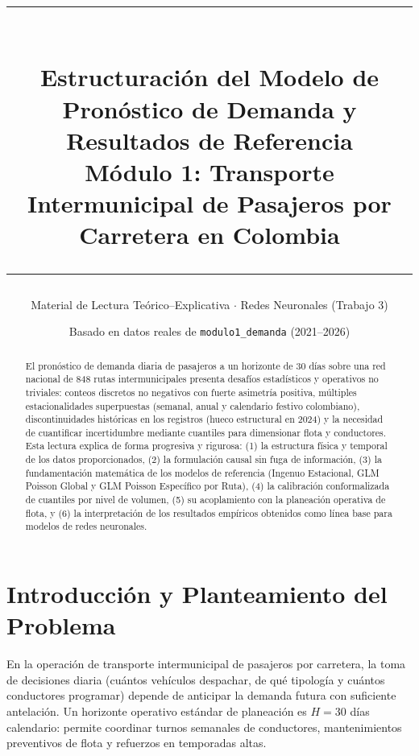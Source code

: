 \documentclass[11pt,a4paper]{article}
\title{
    \vspace{-1cm}
    {\color{azulInst}\rule{\linewidth}{1.5pt}}\\[0.4cm]
    {\Huge\bfseries\color{azulInst} Estructuración del Modelo de Pronóstico de Demanda y Resultados de Referencia}\\[0.25cm]
    {\Large\color{azulSec} Módulo 1: Transporte Intermunicipal de Pasajeros por Carretera en Colombia}\\[0.2cm]
    {\color{azulInst}\rule{\linewidth}{0.8pt}}
}
\author{Material de Lectura Teórico--Explicativa $\cdot$ Redes Neuronales (Trabajo 3)}
\date{Basado en datos reales de \texttt{modulo1\_demanda} (2021--2026)}
\begin{document}
\maketitle
\thispagestyle{empty}

\begin{abstract}
\noindent El pronóstico de demanda diaria de pasajeros a un horizonte de 30 días sobre una red nacional de 848 rutas intermunicipales presenta desafíos estadísticos y operativos no triviales: conteos discretos no negativos con fuerte asimetría positiva, múltiples estacionalidades superpuestas (semanal, anual y calendario festivo colombiano), discontinuidades históricas en los registros (hueco estructural en 2024) y la necesidad de cuantificar incertidumbre mediante cuantiles para dimensionar flota y conductores. Esta lectura explica de forma progresiva y rigurosa: (1) la estructura física y temporal de los datos proporcionados, (2) la formulación causal sin fuga de información, (3) la fundamentación matemática de los modelos de referencia (Ingenuo Estacional, GLM Poisson Global y GLM Poisson Específico por Ruta), (4) la calibración conformalizada de cuantiles por nivel de volumen, (5) su acoplamiento con la planeación operativa de flota, y (6) la interpretación de los resultados empíricos obtenidos como línea base para modelos de redes neuronales.
\end{abstract}

\tableofcontents
\newpage

\section{Introducción y Planteamiento del Problema}

En la operación de transporte intermunicipal de pasajeros por carretera, la toma de decisiones diaria (cuántos vehículos despachar, de qué tipología y cuántos conductores programar) depende de anticipar la demanda futura con suficiente antelación. Un horizonte operativo estándar de planeación es $H = 30$ días calendario: permite coordinar turnos semanales de conductores, mantenimientos preventivos de flota y refuerzos en temporadas altas.
\end{document}
